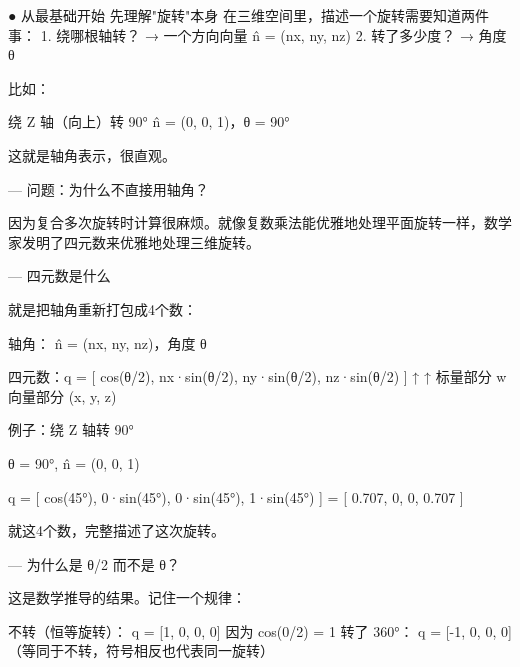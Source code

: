 ● 从最基础开始                                                                                                                                                                                                                                                                                                                                                                                                        
  先理解"旋转"本身                                                                                                                                                                                            
  在三维空间里，描述一个旋转需要知道两件事：                                                                                                                                                                                                                                                                                                                                                                          
  1. 绕哪根轴转？   → 一个方向向量 n̂ = (nx, ny, nz)
  2. 转了多少度？   → 角度 θ

  比如：

  绕 Z 轴（向上）转 90°
  n̂ = (0, 0, 1)，θ = 90°

  这就是轴角表示，很直观。

  ---
  问题：为什么不直接用轴角？

  因为复合多次旋转时计算很麻烦。就像复数乘法能优雅地处理平面旋转一样，数学家发明了四元数来优雅地处理三维旋转。

  ---
  四元数是什么

  就是把轴角重新打包成4个数：

  轴角：  n̂ = (nx, ny, nz)，角度 θ

  四元数：q = [ cos(θ/2),  nx·sin(θ/2),  ny·sin(θ/2),  nz·sin(θ/2) ]
               ↑             ↑
             标量部分 w      向量部分 (x, y, z)

  例子：绕 Z 轴转 90°

  θ = 90°,  n̂ = (0, 0, 1)

  q = [ cos(45°),  0·sin(45°),  0·sin(45°),  1·sin(45°) ]
    = [ 0.707,     0,           0,            0.707       ]

  就这4个数，完整描述了这次旋转。

  ---
  为什么是 θ/2 而不是 θ？

  这是数学推导的结果。记住一个规律：

  不转（恒等旋转）：  q = [1, 0, 0, 0]   因为 cos(0/2) = 1
  转了 360°：       q = [-1, 0, 0, 0]   （等同于不转，符号相反也代表同一旋转）

